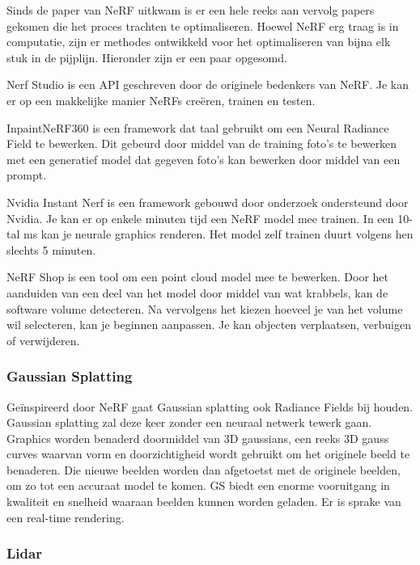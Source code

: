 \documentclass{hogent-article}
\begin{document}
Sinds de paper van NeRF uitkwam is er een hele reeks aan vervolg papers gekomen die het proces trachten te optimaliseren. Hoewel NeRF erg traag is in computatie, zijn er methodes ontwikkeld voor het optimaliseren van bijna elk stuk in de pijplijn. Hieronder zijn er een paar opgesomd.

Nerf Studio is een API  geschreven door de originele bedenkers van NeRF. Je kan er op een makkelijke manier NeRFs creëren, trainen en testen. \autocite{Tancik2023a}

InpaintNeRF360 is een framework dat taal gebruikt om een Neural Radiance Field te bewerken. Dit gebeurd door middel van de training foto’s te bewerken met een generatief model dat gegeven foto’s kan bewerken door middel van een prompt. \autocite{Wang2023a}


Nvidia Instant Nerf is een framework gebouwd door onderzoek ondersteund door Nvidia. Je kan er op enkele minuten tijd een NeRF model mee trainen. In een 10-tal ms kan je neurale graphics renderen. Het model zelf trainen duurt volgens hen slechts 5 minuten. 
\autocite{Mueller2022}

NeRF Shop is een tool om een point cloud model mee te bewerken. Door het aanduiden van een deel van het model door middel van wat krabbels, kan de software volume detecteren. Na vervolgens het kiezen hoeveel je van het volume wil selecteren, kan je beginnen aanpassen. 
Je kan objecten verplaatsen, verbuigen of verwijderen.\autocite{NeRFshop23}

\subsubsection{Gaussian Splatting}

Geïnspireerd door NeRF gaat Gaussian splatting ook Radiance Fields bij houden. Gaussian splatting zal deze keer zonder een neuraal netwerk tewerk gaan. Graphics worden benaderd doormiddel van 3D gaussians, een reeks 3D gauss curves waarvan vorm en doorzichtigheid wordt gebruikt om het originele beeld te benaderen. Die nieuwe beelden worden dan afgetoetst met de originele beelden, om zo tot een accuraat model te komen.
GS biedt een enorme vooruitgang in kwaliteit en snelheid waaraan beelden kunnen worden geladen. Er is sprake van een real-time rendering. \autocite{Kerbl2023}

\subsubsection{Lidar}
\end{document}

